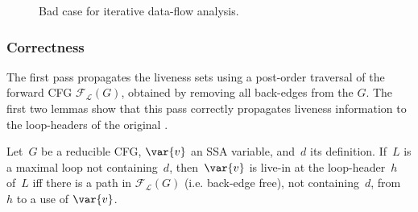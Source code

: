 \begin{figure}[t]
   \begin{center}
   \end{center}
   \caption{Bad case for iterative data-flow analysis.}
   \label{fig:liveness_dataflow}
\end{figure}


\subsubsection{Correctness}
\label{sec:correctnessdebase}



The first pass propagates the liveness sets using a post-order traversal of the forward CFG $\mathcal{F}_\mathcal{L}(G)$, obtained by removing all back-edges from the \@CFG $G$.
The first two lemmas show that this pass correctly propagates liveness information to the loop-headers of the original \@CFG.
\begin{lemma}
	\label{lemma:firstpass}
	Let~$G$ be a reducible CFG, $\var{v}$ an SSA variable, and~$d$ its definition.
	If~$L$ is a maximal loop not containing~$d$, then~$\var{v}$ is live-in at the loop-header~$h$ of~$L$ iff there is a path in $\mathcal{F}_\mathcal{L}(G)$ (i.e. back-edge free), not containing~$d$, from~$h$ to a use of $\var{v}$.
\end{lemma}

